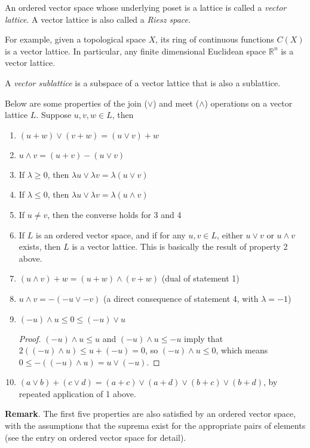 \documentclass[12pt]{article}
\begin{document}
An ordered vector space whose underlying poset is a lattice is called a \emph{vector lattice}.  A vector lattice is also called a \emph{Riesz space}.

For example, given a topological space $X$, its ring of continuous functions $C(X)$ is a vector lattice.  In particular, any finite dimensional Euclidean space $\mathbb{R}^n$ is a vector lattice.

A \emph{vector sublattice} is a subspace of a vector lattice that is also a sublattice.

Below are some properties of the join ($\vee$) and meet ($\wedge$) operations on a vector lattice $L$.  Suppose $u,v,w\in L$, then
\begin{enumerate}
\item $(u+w) \vee (v+w)=(u\vee v)+w$
\item $u\wedge v=(u+v)-(u\vee v)$
\item If $\lambda\ge 0$, then $\lambda u\vee \lambda v=\lambda(u\vee v)$
\item If $\lambda\le 0$, then $\lambda u\vee \lambda v=\lambda(u\wedge v)$
\item If $u\ne v$, then the converse holds for 3 and 4
\item If $L$ is an ordered vector space, and if for any $u,v\in L$, either $u\vee v$ or $u\wedge v$ exists, then $L$ is a vector lattice.  This is basically the result of property 2 above.
\item $(u\wedge v)+w=(u+w)\wedge (v+w)$ (dual of statement 1)
\item $u\wedge v=-(-u\vee -v)$ (a direct consequence of statement 4, with $\lambda=-1$)
\item $(-u)\wedge u\le 0\le (-u)\vee u$
\begin{proof}
$(-u)\wedge u\le u$ and $(-u)\wedge u\le -u$ imply that $2((-u)\wedge u)\le u+(-u)=0$, so $(-u)\wedge u\le 0$, which means $0\le -((-u)\wedge u)=u\vee (-u)$.
\end{proof}
\item $(a\vee b)+(c\vee d)=(a+c)\vee (a+d)\vee (b+c)\vee (b+d)$, by repeated application of 1 above.
\end{enumerate}
\textbf{Remark}.  The first five properties are also satisfied by an ordered vector space, with the assumptions that the suprema exist for the appropriate pairs of elements (see the entry on ordered vector space for detail).
\end{document}
